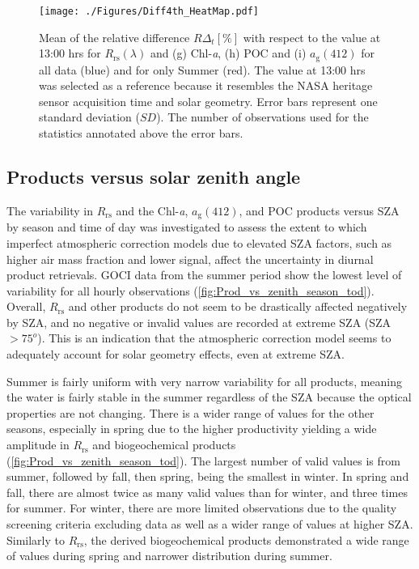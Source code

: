 \documentclass[remotesensing,article,submit,moreauthors,pdftex,10pt,a4paper]{Definitions/mdpi}
\begin{document}
               
\begin{figure}[htbp!]
  \centering
  \texttt{[image: ./Figures/Diff4th\_HeatMap.pdf]}
    \caption{Mean of the relative difference $R\Delta_t[\%]$ with respect to the value at 13:00 hrs for $R_\text{rs}(\lambda)$ and (g) Chl-{\it a}, (h) POC and (i) $a_\text{g}(412)$ for all data (blue) and for only Summer (red). The value at 13:00 hrs was selected as a reference because it resembles the NASA heritage sensor acquisition time and solar geometry. Error bars represent one standard deviation ($SD$). The number of observations used for the statistics annotated above the error bars. \label{fig:Diff4th} } 
\end{figure}

\subsection{Products versus solar zenith angle}
The variability in $R_\text{rs}$ and the Chl-{\it a}, $a_\text{g}(412)$, and POC products versus SZA by season and time of day was investigated to assess the extent to which imperfect atmospheric correction models due to elevated SZA factors, such as higher air mass fraction and lower signal, affect the uncertainty in diurnal product retrievals. GOCI data from the summer period show the lowest level of variability for all hourly observations (\autoref{fig:Prod_vs_zenith_season_tod}). Overall, $R_\text{rs}$ and other products do not seem to be drastically affected negatively by SZA, and no negative or invalid values are recorded at extreme SZA (SZA$>75^o$). This is an indication that the atmospheric correction model seems to adequately account for solar geometry effects, even at extreme SZA.

Summer is fairly uniform with very narrow variability for all products, meaning the water is fairly stable in the summer regardless of the SZA because the optical properties are not changing. There is a wider range of values for the other seasons, especially in spring due to the higher productivity yielding a wide amplitude in $R_\text{rs}$ and biogeochemical products (\autoref{fig:Prod_vs_zenith_season_tod}). The largest number of valid values is from summer, followed by fall, then spring, being the smallest in winter. In spring and fall, there are almost twice as many valid values than for winter, and three times for summer. For winter, there are more limited observations due to the quality screening criteria excluding data as well as a wider range of values at higher SZA. Similarly to $R_\text{rs}$, the derived biogeochemical products demonstrated a wide range of values during spring and narrower distribution during summer.
\end{document}
